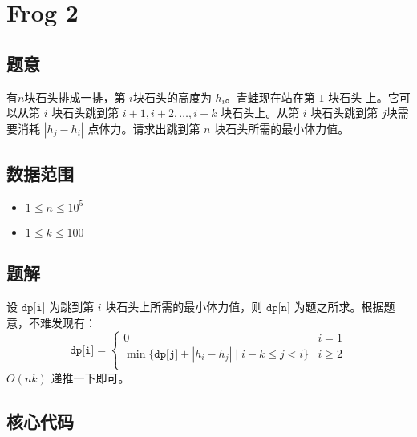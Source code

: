 \section{Frog 2}
\subsection*{题意}
有$n$块石头排成一排，第 $i$块石头的高度为 $h_i$。青蛙现在站在第 $1$ 块石头	上。它可以从第 $i$ 块石头跳到第 $i+1,i+2,\dots,i+k$ 块石头上。从第 $i$ 块石头跳到第 $j$块需要消耗 $|h_j - h_i|$ 点体力。请求出跳到第 $n$ 块石头所需的最小体力值。

\subsection*{数据范围}
\begin{itemize}
\item $1\le n\le 10^5$
\item $1\le k\le 100$
\end{itemize}

\subsection*{题解}

设 ${\texttt{dp[i]}}$ 为跳到第 $i$ 块石头上所需的最小体力值，则 ${\texttt{dp[n]}}$ 为题之所求。根据题意，不难发现有：
\begin{equation*}
{\texttt{dp[i]}} = 
\begin{cases}
 0 & i = 1\\
\min\{{\texttt{dp[j]}} + |h_i-h_j|\mid i-k\le j < i\} & i \ge 2\\
\end{cases}
\end{equation*}
$O(nk)$ 递推一下即可。
\subsection*{核心代码}
\inputminted[linenos,autogobble]{cpp}{../Code/B.cpp}
\newpage
